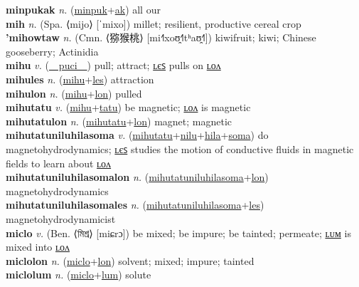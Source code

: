 \textbf{minpukak} \textit{n.} (\hyperref[minpuk]{minpuk}+\hyperref[ak]{ak})
all our \label{minpukak} \\
\textbf{mih} \textit{n.} (Spa. ⟨mijo⟩ [ˈmixo])
millet; resilient, productive cereal crop \label{mih} \\
\textbf{'mihowtaw} \textit{n.} (Cmn. ⟨猕猴桃⟩ [mi˧˥xoʊ̯˧˥tʰaʊ̯˧˥])
kiwifruit; kiwi; Chinese gooseberry; Actinidia \label{'mihowtaw} \\
\textbf{mihu} \textit{v.} (\hyperref[puci]{~~puci~~})
pull; attract; \hyperref[mihules]{ʟєꜱ} pulls on \hyperref[mihulon]{ʟᴏᴧ} \label{mihu} \\
\textbf{mihules} \textit{n.} (\hyperref[mihu]{mihu}+\hyperref[les]{les})
attraction \label{mihules} \\
\textbf{mihulon} \textit{n.} (\hyperref[mihu]{mihu}+\hyperref[lon]{lon})
pulled \label{mihulon} \\
\textbf{mihutatu} \textit{v.} (\hyperref[mihu]{mihu}+\hyperref[tatu]{tatu})
be magnetic; \hyperref[mihutatulon]{ʟᴏᴧ} is magnetic \label{mihutatu} \\
\textbf{mihutatulon} \textit{n.} (\hyperref[mihutatu]{mihutatu}+\hyperref[lon]{lon})
magnet; magnetic \label{mihutatulon} \\
\textbf{mihutatuniluhilasoma} \textit{v.} (\hyperref[mihutatu]{mihutatu}+\hyperref[nilu]{nilu}+\hyperref[hila]{hila}+\hyperref[soma]{soma})
do magnetohydrodynamics; \hyperref[mihutatuniluhilasomales]{ʟєꜱ} studies the motion of conductive fluids in magnetic fields to learn about \hyperref[mihutatuniluhilasomalon]{ʟᴏᴧ} \label{mihutatuniluhilasoma} \\
\textbf{mihutatuniluhilasomalon} \textit{n.} (\hyperref[mihutatuniluhilasoma]{mihutatuniluhilasoma}+\hyperref[lon]{lon})
magnetohydrodynamics \label{mihutatuniluhilasomalon} \\
\textbf{mihutatuniluhilasomales} \textit{n.} (\hyperref[mihutatuniluhilasoma]{mihutatuniluhilasoma}+\hyperref[les]{les})
magnetohydrodynamicist \label{mihutatuniluhilasomales} \\
\textbf{miclo} \textit{v.} (Ben. ⟨মিশ্র⟩ [miɕrɔ])
be mixed; be impure; be tainted; permeate; \hyperref[miclolum]{ʟᴜᴍ} is mixed into \hyperref[miclolon]{ʟᴏᴧ} \label{miclo} \\
\textbf{miclolon} \textit{n.} (\hyperref[miclo]{miclo}+\hyperref[lon]{lon})
solvent; mixed; impure; tainted \label{miclolon} \\
\textbf{miclolum} \textit{n.} (\hyperref[miclo]{miclo}+\hyperref[lum]{lum})
solute \label{miclolum} \\
